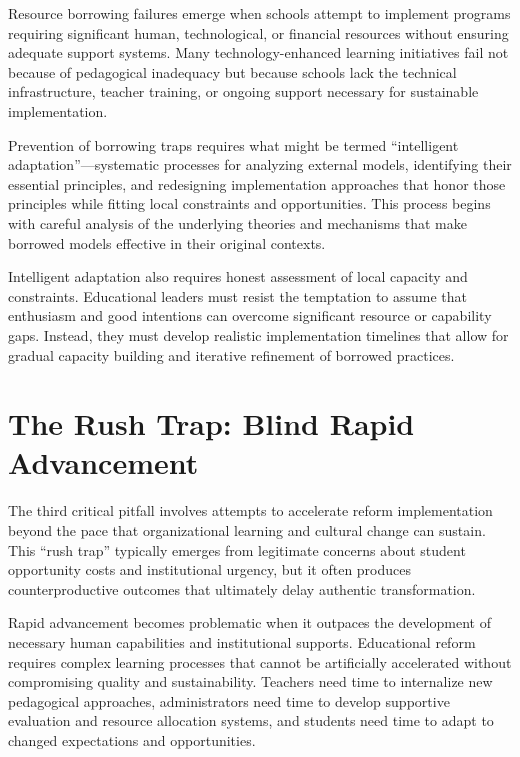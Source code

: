 \documentclass[
  Letterpaper,
]{scrbook}
\begin{document}
Resource borrowing failures emerge when schools attempt to implement
programs requiring significant human, technological, or financial
resources without ensuring adequate support systems. Many
technology-enhanced learning initiatives fail not because of pedagogical
inadequacy but because schools lack the technical infrastructure,
teacher training, or ongoing support necessary for sustainable
implementation.

Prevention of borrowing traps requires what might be termed
``intelligent adaptation''---systematic processes for analyzing external
models, identifying their essential principles, and redesigning
implementation approaches that honor those principles while fitting
local constraints and opportunities. This process begins with careful
analysis of the underlying theories and mechanisms that make borrowed
models effective in their original contexts.

Intelligent adaptation also requires honest assessment of local capacity
and constraints. Educational leaders must resist the temptation to
assume that enthusiasm and good intentions can overcome significant
resource or capability gaps. Instead, they must develop realistic
implementation timelines that allow for gradual capacity building and
iterative refinement of borrowed practices.

\section{The Rush Trap: Blind Rapid
Advancement}\label{the-rush-trap-blind-rapid-advancement}

The third critical pitfall involves attempts to accelerate reform
implementation beyond the pace that organizational learning and cultural
change can sustain. This ``rush trap'' typically emerges from legitimate
concerns about student opportunity costs and institutional urgency, but
it often produces counterproductive outcomes that ultimately delay
authentic transformation.

Rapid advancement becomes problematic when it outpaces the development
of necessary human capabilities and institutional supports. Educational
reform requires complex learning processes that cannot be artificially
accelerated without compromising quality and sustainability. Teachers
need time to internalize new pedagogical approaches, administrators need
time to develop supportive evaluation and resource allocation systems,
and students need time to adapt to changed expectations and
opportunities.
\end{document}
